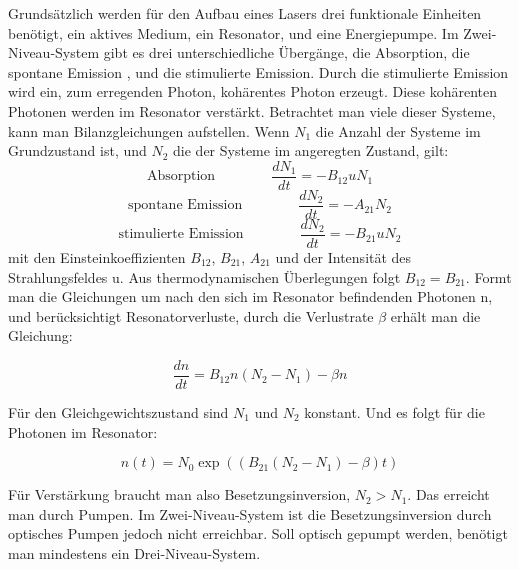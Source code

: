 \documentclass[10pt,twoside]{article}
\renewcommand{\1}{^{-1}}
\renewcommand{\2}{^{-2}}
\newcommand{\3}{^{-3}}
\newcommand{\4}{^{-4}}
\newcommand{\5}{^{-5}}
\newcommand{\6}{^{-6}}
\newcommand{\7}{^{-7}}
\newcommand{\8}{^{-8}}
\newcommand{\9}{^{-9}}
\begin{document}
Grundsätzlich werden für den Aufbau eines Lasers drei funktionale Einheiten benötigt, ein aktives Medium, ein Resonator, und eine Energiepumpe.
Im Zwei-Niveau-System gibt es drei unterschiedliche Übergänge, die Absorption, die spontane Emission , und die stimulierte Emission.
Durch die stimulierte Emission wird ein, zum erregenden Photon, kohärentes Photon erzeugt. Diese kohärenten Photonen werden im Resonator verstärkt.
Betrachtet man viele dieser Systeme, kann man Bilanzgleichungen aufstellen.
Wenn $N_1$ die Anzahl der Systeme im Grundzustand ist, und $N_2$ die der Systeme im angeregten Zustand, gilt:
\begin{equation}
\mathrm{Absorption} \qquad \qquad \frac{dN_1}{dt}= -B_{12} u N_1
\end{equation}
\begin{equation}
\mathrm{spontane \, \, Emission} \qquad \qquad \frac{dN_2}{dt}= - A_{21}  N_2
\end{equation}
\begin{equation}
\mathrm{stimulierte \, \, Emission} \qquad \qquad \frac{dN_2}{dt}= -B_{21} u N_2
\end{equation}
mit den Einsteinkoeffizienten $B_{12}$, $B_{21}$, $A_{21}$ und der Intensität des Strahlungsfeldes u. Aus thermodynamischen Überlegungen folgt $B_{12} = B_{21}$.
Formt man die Gleichungen um nach den sich im Resonator befindenden Photonen n, und berücksichtigt Resonatorverluste, durch die Verlustrate $\beta$ erhält man die Gleichung:

\begin{equation}
\frac{dn}{dt} = B_{12} n (N_2-N_1)-\beta n
\end{equation}

Für den Gleichgewichtszustand sind $N_1$ und $N_2$ konstant. Und es folgt für die Photonen im Resonator:

\begin{equation}
n(t)= N_0 \exp{ \left( \left( B_{21} \left( N_2 - N_1 \right) - \beta \right) t \right) }
\end{equation}

Für Verstärkung braucht man also Besetzungsinversion, $N_2 > N_1$. Das erreicht man durch Pumpen. Im Zwei-Niveau-System ist die Besetzungsinversion durch optisches Pumpen jedoch nicht erreichbar.
Soll optisch gepumpt werden, benötigt man mindestens ein Drei-Niveau-System.
\end{document}
